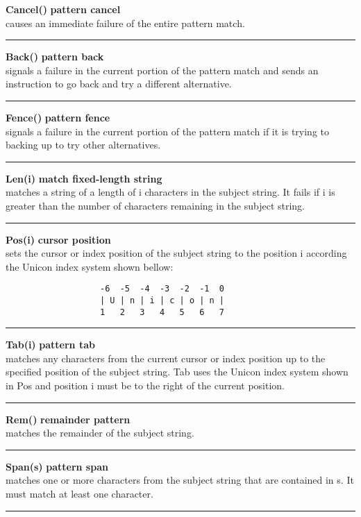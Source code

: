 \documentclass{article}
\begin{document}
\noindent\textbf{Cancel()} \hfill\textbf{pattern cancel}\\
causes an immediate failure of the entire pattern match.\\
\noindent\rule{12cm}{0.1pt}

\noindent\textbf{Back()} \hfill\textbf{pattern back}\\
signals a failure in the current portion of the pattern match and sends an instruction to go back and try a different alternative.\\
\noindent\rule{12cm}{0.1pt}

\noindent\textbf{Fence()} \hfill\textbf{pattern fence}\\
signals a failure in the current portion of the pattern match if it is trying to backing up to try other alternatives.\\
\noindent\rule{12cm}{0.1pt}

\noindent\textbf{Len(i)} \hfill\textbf{match fixed-length string}\\
matches a string of a length of i characters in the subject string.  It fails if i is greater than the number of characters remaining in the subject string.\\
\noindent\rule{12cm}{0.1pt}

\noindent\textbf{Pos(i)} \hfill\textbf{cursor position}\\
sets the cursor or index position of the subject string to the position i according the Unicon index system shown bellow:
\begin{verbatim}
                   -6  -5  -4  -3  -2  -1  0
                   | U | n | i | c | o | n |
                   1   2   3   4   5   6   7
\end{verbatim}
\noindent\rule{12cm}{0.1pt}

\noindent\textbf{Tab(i)} \hfill\textbf{pattern tab}\\
matches any characters from the current cursor or index position up to the specified position of the subject string. Tab uses the Unicon index system shown in Pos and position i must be to the right of the current position.\\
\noindent\rule{12cm}{0.1pt}

\noindent\textbf{Rem()} \hfill\textbf{remainder pattern}\\
matches the remainder of the subject string.\\
\noindent\rule{12cm}{0.1pt}

\noindent\textbf{Span(s)} \hfill\textbf{pattern span}\\
matches one or more characters from the subject string that are contained in s.  It must match at least one character.\\
\noindent\rule{12cm}{0.1pt}
\end{document}
